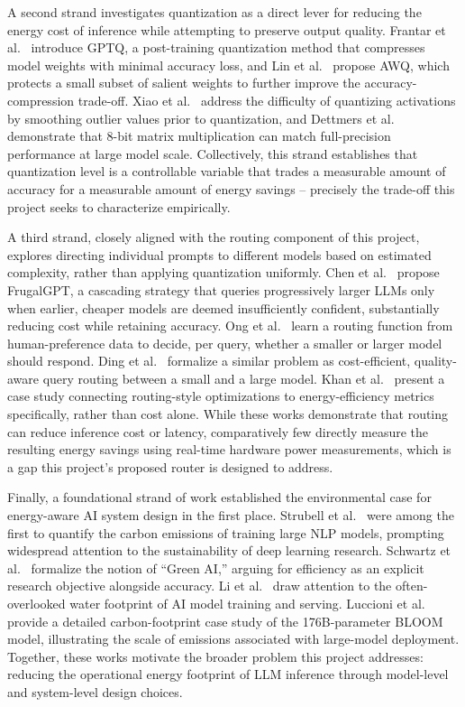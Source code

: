 \documentclass[runningheads]{llncs}
\begin{document}
A second strand investigates quantization as a direct lever for reducing the energy cost of inference while attempting to preserve output quality. Frantar et al.~\cite{frantar2022gptq} introduce GPTQ, a post-training quantization method that compresses model weights with minimal accuracy loss, and Lin et al.~\cite{lin2024awq} propose AWQ, which protects a small subset of salient weights to further improve the accuracy-compression trade-off. Xiao et al.~\cite{xiao2023smoothquant} address the difficulty of quantizing activations by smoothing outlier values prior to quantization, and Dettmers et al.~\cite{dettmers2022llmint8} demonstrate that 8-bit matrix multiplication can match full-precision performance at large model scale. Collectively, this strand establishes that quantization level is a controllable variable that trades a measurable amount of accuracy for a measurable amount of energy savings -- precisely the trade-off this project seeks to characterize empirically.

A third strand, closely aligned with the routing component of this project, explores directing individual prompts to different models based on estimated complexity, rather than applying quantization uniformly. Chen et al.~\cite{chen2023frugalgpt} propose FrugalGPT, a cascading strategy that queries progressively larger LLMs only when earlier, cheaper models are deemed insufficiently confident, substantially reducing cost while retaining accuracy. Ong et al.~\cite{ong2024routellm} learn a routing function from human-preference data to decide, per query, whether a smaller or larger model should respond. Ding et al.~\cite{ding2024hybridllm} formalize a similar problem as cost-efficient, quality-aware query routing between a small and a large model. Khan et al.~\cite{khan2025optimizing} present a case study connecting routing-style optimizations to energy-efficiency metrics specifically, rather than cost alone. While these works demonstrate that routing can reduce inference cost or latency, comparatively few directly measure the resulting energy savings using real-time hardware power measurements, which is a gap this project's proposed router is designed to address.

Finally, a foundational strand of work established the environmental case for energy-aware AI system design in the first place. Strubell et al.~\cite{strubell2019energy} were among the first to quantify the carbon emissions of training large NLP models, prompting widespread attention to the sustainability of deep learning research. Schwartz et al.~\cite{schwartz2020greenai} formalize the notion of ``Green AI,'' arguing for efficiency as an explicit research objective alongside accuracy. Li et al.~\cite{li2023thirsty} draw attention to the often-overlooked water footprint of AI model training and serving. Luccioni et al.~\cite{luccioni2023bloom} provide a detailed carbon-footprint case study of the 176B-parameter BLOOM model, illustrating the scale of emissions associated with large-model deployment. Together, these works motivate the broader problem this project addresses: reducing the operational energy footprint of LLM inference through model-level and system-level design choices.
\end{document}
